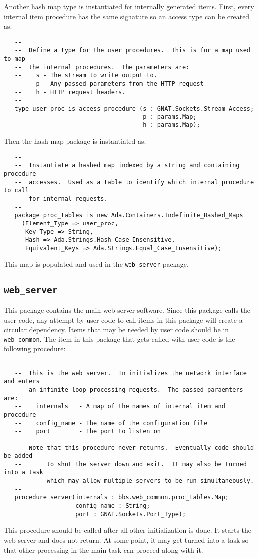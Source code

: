\documentclass[10pt, openany]{book}
\begin{document}
Another hash map type is instantiated for internally generated items.  First, every internal item procedure has the same signature so an access type can be created as:
\begin{lstlisting}
   --
   --  Define a type for the user procedures.  This is for a map used to map
   --  the internal procedures.  The parameters are:
   --    s - The stream to write output to.
   --    p - Any passed parameters from the HTTP request
   --    h - HTTP request headers.
   --
   type user_proc is access procedure (s : GNAT.Sockets.Stream_Access;
                                       p : params.Map;
                                       h : params.Map);
\end{lstlisting}
Then the hash map package is instantiated as:
\begin{lstlisting}
   --
   --  Instantiate a hashed map indexed by a string and containing procedure
   --  accesses.  Used as a table to identify which internal procedure to call
   --  for internal requests.
   --
   package proc_tables is new Ada.Containers.Indefinite_Hashed_Maps
     (Element_Type => user_proc,
      Key_Type => String,
      Hash => Ada.Strings.Hash_Case_Insensitive,
      Equivalent_Keys => Ada.Strings.Equal_Case_Insensitive);
\end{lstlisting}
This map is populated and used in the \texttt{web\_server} package.

\subsection{\texttt{web\_server}}
This package contains the main web server software.  Since this package calls the user code, any attempt by user code to call items in this package will create a circular dependency.  Items that may be needed by user code should be in \texttt{web\_common}.  The item in this package that gets called with user code is the following procedure:
\begin{lstlisting}
   --
   --  This is the web server.  In initializes the network interface and enters
   --  an infinite loop processing requests.  The passed paraemters are:
   --    internals   - A map of the names of internal item and procedure
   --    config_name - The name of the configuration file
   --    port        - The port to listen on
   --
   --  Note that this procedure never returns.  Eventually code should be added
   --       to shut the server down and exit.  It may also be turned into a task
   --       which may allow multiple servers to be run simultaneously.
   --
   procedure server(internals : bbs.web_common.proc_tables.Map;
                    config_name : String;
                    port : GNAT.Sockets.Port_Type);
\end{lstlisting}
This procedure should be called after all other initialization is done.  It starts the web server and does not return.  At some point, it may get turned into a task so that other processing in the main task can proceed along with it.
\end{document}
